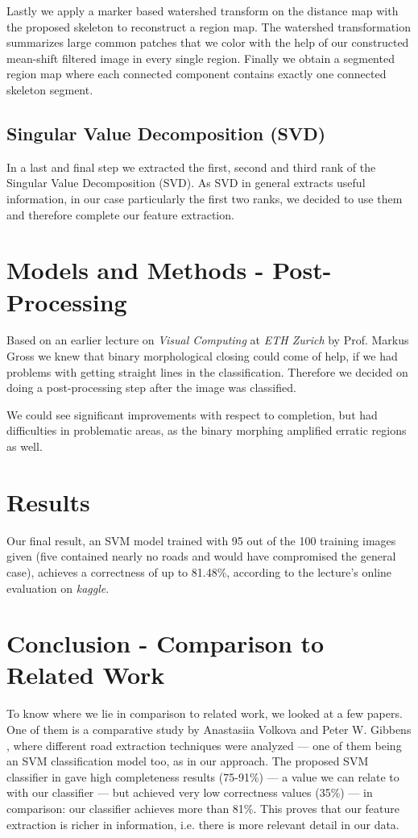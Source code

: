 \documentclass[10pt,conference,compsocconf]{IEEEtran}
\begin{document}
Lastly we apply a marker based watershed transform on the distance map with the proposed skeleton to reconstruct a region map. The watershed transformation summarizes large common patches that we color with the help of our constructed mean-shift filtered image in every single region. Finally we obtain a segmented region map where each connected component contains exactly one connected skeleton segment. 

\subsection{Singular Value Decomposition (SVD)}

In a last and final step we extracted the first, second and third rank of the Singular Value Decomposition (SVD). As SVD in general extracts useful information, in our case particularly the first two ranks, we decided to use them and therefore complete our feature extraction.

\section{Models and Methods - Post-Processing}

Based on an earlier lecture on \emph{Visual Computing} at \emph{ETH Zurich} by Prof. Markus Gross we knew that binary morphological closing could come of help, if we had problems with getting straight lines in the classification. Therefore we decided on doing a post-processing step after the image was classified.

We could see significant improvements with respect to completion, but had difficulties in problematic areas, as the binary morphing amplified erratic regions as well.

\section{Results}
\label{sec:results}

Our final result, an SVM model trained with 95 out of the 100 training images given (five contained nearly no roads and would have compromised the general case), achieves a correctness of up to 81.48\%, according to the lecture's online evaluation on \emph{kaggle}.

\section{Conclusion - Comparison to Related Work}
\label{sec:comparison}
To know where we lie in comparison to related work, we looked at a few papers. One of them is a comparative study by Anastasiia Volkova and Peter W. Gibbens \cite{VoGi15}, where different road extraction techniques were analyzed --- one of them being an SVM classification model too, as in our approach. The proposed SVM classifier in \cite{VoGi15} gave high completeness results (75-91\%) --- a value we can relate to with our classifier --- but achieved very low correctness values (35\%) --- in comparison: our classifier achieves more than 81\%. This proves that our feature extraction is richer in information, i.e. there is more relevant detail in our data.
\end{document}
